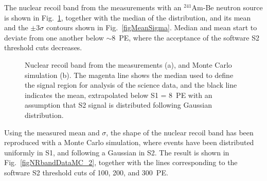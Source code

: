 The nuclear recoil band from the measurements with an $^{241}$Am-Be neutron source is shown in Fig.~\ref{figNRbandDataMC}, together with the median of the distribution, and its mean and the $\pm$3$\sigma$ contours shown in Fig.~\ref{figMeanSigma}. Median and mean start to deviate from one another below $\sim$8~PE, where the acceptance of the software S2 threshold cuts decreases. 

\begin{figure}[!h]
\centering
{}
\caption[Nuclear recoil band from the measurements and Monte Carlo simulation]{Nuclear recoil band from the measurements (a), and Monte Carlo simulation (b). The magenta line shows the median used to define the signal region for analysis of the science data, and the black line indicates the mean, extrapolated below S1 = 8~PE with an assumption that S2 signal is distributed following Gaussian distribution.}
\label{figNRbandDataMC}
\end{figure}

Using the measured mean and $\sigma$, the shape of the nuclear recoil band has been reproduced with a Monte Carlo simulation, where events have been distributed uniformly in S1, and following a Gaussian in S2. The result is shown in Fig.~\ref{figNRbandDataMC_2}, together with the lines corresponding to the software S2 threshold cuts of 100, 200, and 300~PE.

